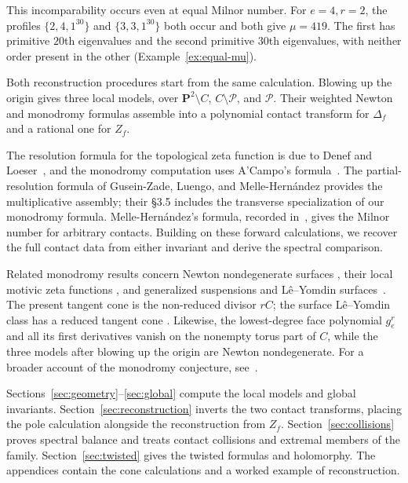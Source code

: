 \documentclass[11pt]{article}
\numberwithin{equation}{section}
\theoremstyle{definition}
\theoremstyle{remark}
\newcommand{\PP}{\mathbf P}
\begin{document}
This incomparability occurs even at equal Milnor number.
For $e=4,r=2$, the profiles
$\{2,4,1^{30}\}$ and $\{3,3,1^{30}\}$ both occur and both give
$\mu=419$. The first has primitive $20$th eigenvalues and the
second primitive $30$th eigenvalues, with neither order
present in the other
(Example~\ref{ex:equal-mu}).

Both reconstruction procedures start from the same calculation.
Blowing up the origin gives three local models, over
$\PP^2\setminus C$, $C\setminus\mathcal P$, and
$\mathcal P$. Their weighted Newton and monodromy formulas
assemble into a polynomial contact transform for $\Delta_f$
and a rational one for $Z_f$.

The resolution formula for the topological zeta function is due
to Denef and Loeser~\cite{DL92}, and the monodromy computation
uses A'Campo's formula~\cite{AC75}. The partial-resolution
formula of Gusein-Zade, Luengo, and Melle-Hern\'andez
\cite[Theorem~1 and Corollary~1]{GLM97} provides the
multiplicative assembly; their \S3.5 includes the transverse
specialization of our monodromy formula. Melle-Hern\'andez's
formula, recorded in~\cite[\S3.4, Remark~2]{GLM97}, gives the
Milnor number for arbitrary contacts. Building on these
forward calculations, we recover the full contact data
from either invariant and derive the spectral comparison.

Related monodromy results concern Newton nondegenerate surfaces
\cite{LVP11}, their local motivic zeta functions
\cite[Theorem~7.2.1]{LPS26}, and generalized suspensions and
L\^e--Yomdin surfaces~\cite{AGGL26}.
The present tangent cone is the non-reduced divisor $rC$;
the surface L\^e--Yomdin class has a reduced tangent cone
\cite[Definition~7.1]{AGGL26}. Likewise, the lowest-degree
face polynomial $g_e^r$ and all its first derivatives vanish
on the nonempty torus part of $C$, while the three models after
blowing up the origin are Newton nondegenerate. For a broader
account of the monodromy conjecture, see~\cite{Veys24}.

Sections~\ref{sec:geometry}--\ref{sec:global} compute the local
models and global invariants. Section~\ref{sec:reconstruction}
inverts the two contact transforms, placing the pole calculation
alongside the reconstruction from $Z_f$.
Section~\ref{sec:collisions} proves spectral balance and treats
contact collisions and extremal members of the family.
Section~\ref{sec:twisted} gives the twisted formulas and
holomorphy. The appendices contain the cone calculations
and a worked example of reconstruction.
\end{document}
